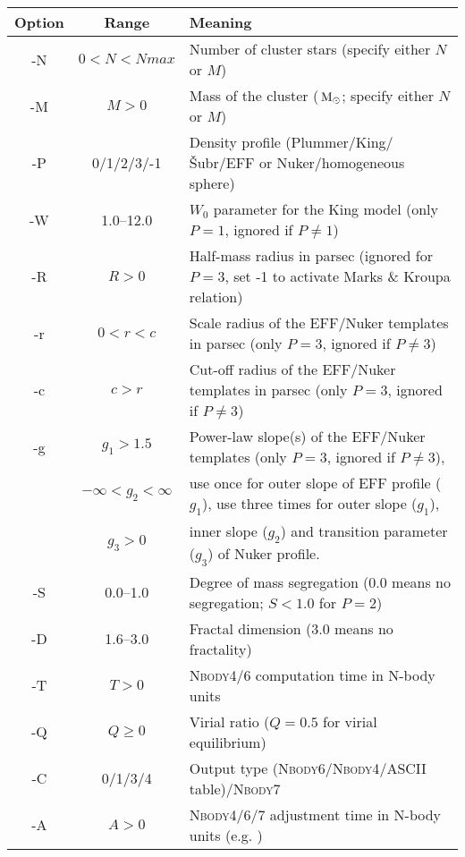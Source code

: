 \documentclass[useAMS,usenatbib]{mn2e}
\newcommand{\msun}{\mbox{$\,{\rm M}_\odot$}}
\begin{document}
\pagestyle{empty}
\begin{table*}
\begin{minipage}{\textwidth}
\centering
\footnotesize{
\begin{tabular}{ccl}
Option & Range & Meaning\\ \hline
      -N & $0<N<Nmax$ & Number of cluster stars (specify either $N$ or $M$)\\                                 
      -M & $M>0$ & Mass of the cluster ($\msun$; specify either $N$ or $M$)\\           
      -P & 0/1/2/3/-1& Density profile (Plummer/King/\v{S}ubr/EFF or Nuker/homogeneous sphere)\\             
      -W & 1.0--12.0 & $W_0$ parameter for the King model (only $P=1$, ignored if $P\neq 1$)\\                       
      -R & $R>0$ & Half-mass radius in parsec (ignored for $P = 3$, set -1 to activate Marks \& Kroupa relation)\\         
      -r & $0<r<c$ & Scale radius of the EFF/Nuker templates in parsec  (only $P=3$, ignored if $P\neq 3$)\\         
      -c & $c>r$ & Cut-off radius of the EFF/Nuker templates in parsec (only $P=3$, ignored if $P\neq 3$)\\       
      -g & $g_1>1.5$ & Power-law slope(s) of the EFF/Nuker templates (only $P=3$, ignored if $P\neq 3$), \\           
      	   & $-\infty<g_2<\infty$  & use once for outer slope of EFF profile ($g_1$), use three times for outer slope ($g_1$), \\
	   &$g_3> 0$ & inner slope ($g_2$) and transition parameter ($g_3$) of Nuker profile.\\ 
      -S & 0.0--1.0 & Degree of mass segregation (0.0 means no segregation; $S<1.0$ for $P=2$)\\
      -D & 1.6--3.0 & Fractal dimension (3.0 means no fractality)\\          
      -T & $T>0$ & \textsc{Nbody4/6} computation time in N-body units\\                            
      -Q & $Q\ge0$ & Virial ratio ($Q = 0.5$ for virial equilibrium)\\                                     
      -C & 0/1/3/4 & Output type (\textsc{Nbody6}/\textsc{Nbody4}/ASCII table)/\textsc{Nbody7}\\    
      -A & $A>0$ & \textsc{Nbody4/6/7} adjustment time in N-body units (e.g. \citealt{Heggie03})\\                            

\end{tabular}}
\end{minipage}
\end{table*}
\end{document}
